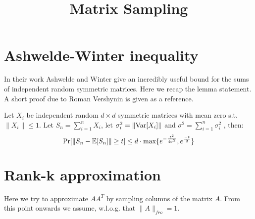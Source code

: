 \documentclass{article}
\title{Matrix Sampling}
\date{\nonumber}
\begin{document}
\maketitle


\section{Ashwelde-Winter inequality}
In their work \cite{AhlswedeW02} Ashwelde and Winter give an incredibly useful bound for 
the sums of independent random symmetric matrices.
Here we recap the lemma statement. 
A short proof due to Roman Vershynin \cite{VershyninMatrixChernoffBounds} is given as a reference.
 
\begin{lemma}
Let $X_i$ be independent random $d \times d$ symmetric matrices with mean zero s.t. $\|X_i\| \le 1$.
Let $S_n = \sum_{i=1}^{n}X_i$, let $\sigma^2_i = \|{\operatorname{Var}}[X_i]\|$ and $\sigma^2 = \sum_{i=1}^{n}\sigma^2_i$ , then:
\[
\Pr[\| S_n - {\mathbb E}[S_n] \| \ge t] \le d\cdot \max\{e^{-\frac{t^2}{4\sigma^2}}, e^{\frac{-t}{2}}\}
\] 
\end{lemma}

\section{Rank-k approximation}

Here we try to approximate $AA^T$ by sampling columns of the matrix $A$.
From this point onwards we assume, w.l.o.g. that $\|A\|_{fro} = 1$.
\end{document}
